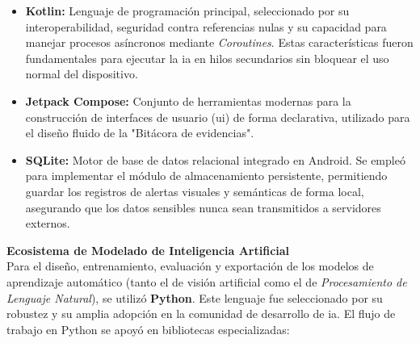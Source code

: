 \begin{itemize}
    \item \textbf{Kotlin:} Lenguaje de programación principal, seleccionado por su interoperabilidad, seguridad contra referencias nulas y su capacidad para manejar procesos asíncronos mediante \textit{Coroutines}. Estas características fueron fundamentales para ejecutar la \gls{ia} en hilos secundarios sin bloquear el uso normal del dispositivo.
    \item \textbf{Jetpack Compose:} Conjunto de herramientas modernas para la construcción de interfaces de usuario (\gls{ui}) de forma declarativa, utilizado para el diseño fluido de la "Bitácora de evidencias".
    \item \textbf{SQLite:} Motor de base de datos relacional integrado en Android. Se empleó para implementar el módulo de almacenamiento persistente, permitiendo guardar los registros de alertas visuales y semánticas de forma local, asegurando que los datos sensibles nunca sean transmitidos a servidores externos.
\end{itemize}

\textbf{Ecosistema de Modelado de Inteligencia Artificial}\\
Para el diseño, entrenamiento, evaluación y exportación de los modelos de aprendizaje automático (tanto el de visión artificial como el de \textit{Procesamiento de Lenguaje Natural}), se utilizó \textbf{Python}. Este lenguaje fue seleccionado por su robustez y su amplia adopción en la comunidad de desarrollo de \gls{ia}. El flujo de trabajo en Python se apoyó en bibliotecas especializadas:


